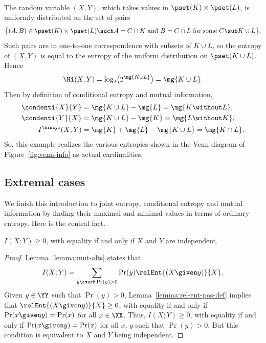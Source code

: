 \begin{example}
\begin{align*}
\end{align*}
% 
The random variable $(X, Y)$, which takes values in $\pset(K) \times
\pset(L)$, is uniformly distributed on the set of pairs
\[
\bigl\{ 
(A, B) \in \pset(K) \times \pset(L) 
\such 
A = C \cap K \text{ and } B = C \cap L
\text{ for some } C \sub K \cup L
\bigr\}.
\]
Such pairs are in one-to-one correspondence with subsets of $K \cup L$, so
the entropy of $(X, Y)$ is equal to the entropy of the uniform distribution
on $\pset(K \cup L)$.  Hence
\[
\Hi(X, Y)
=
\log_2 \bigl( 2^{\mg{K \cup L}} \bigr)
=
\mg{K \cup L}.
\]
Then by definition of conditional entropy and mutual information,
% 
\begin{align*}
\condenti{X}{Y} &
=
\mg{K \cup L} - \mg{L} 
= 
\mg{K \without L},     \\
\condenti{Y}{X} &
=
\mg{K \cup L} - \mg{K} 
= 
\mg{L \without K},     \\
I^{\binsym}(X; Y)       &
=
\mg{K} + \mg{L} - \mg{K \cup L} 
=
\mg{K \cap L}.
\end{align*}
% 
So, this example realizes the various entropies shown in the Venn diagram
of Figure~\ref{fig:venn-info} as actual cardinalities.%
%
\end{example}


\subsection*{Extremal cases}

We finish this introduction to joint entropy, conditional entropy and
mutual information by finding their maximal and minimal values in terms of
ordinary entropy.  Here is the central fact.

\begin{lemma}
$I(X; Y) \geq 0$, with equality if and only if $X$ and $Y$ are independent.
\end{lemma}

\begin{proof}
Lemma~\ref{lemma:mut-alts} states that
\[
I(X; Y) 
= 
\sum_{y \csuch \Pr(y) > 0} \Pr(y) 
\relEnt{(X \given y)}{X}.
\]
Given $y \in \YY$ such that $\Pr(y) > 0$, Lemma~\ref{lemma:rel-ent-pos-def}
implies that $\relEnt{(X \given y)}{X} \geq 0$, with equality if and only
if $\Pr(x \given y) = \Pr(x)$ for all $x \in \XX$.  Thus, $I(X; Y) \geq 0$,
with equality if and only if $\Pr(x \given y) = \Pr(x)$ for all $x$, $y$
such that $\Pr(y) > 0$.  But this condition is equivalent to $X$ and $Y$
being independent.
\end{proof}

